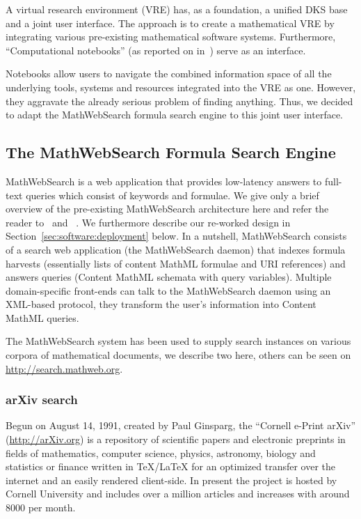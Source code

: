 \def\MWS{MathWebSearch\xspace}

A virtual research environment (VRE) has, as a foundation, a unified DKS base and a joint user interface. 
The \pn approach is to create a mathematical VRE by integrating various pre-existing mathematical software systems. 
Furthermore, ``Computational notebooks'' (as reported on in~\cite{ODK-D4.2}) serve as an interface. 

Notebooks allow users to navigate the combined information space of all the underlying tools, systems and resources integrated into the VRE as one. 
However, they aggravate the already serious problem of finding anything. 
Thus, we decided to adapt the \MWS formula search engine to this joint user interface. 

\subsection{The \MWS Formula Search Engine}

\MWS is a web application that provides low-latency answers to full-text queries which consist of keywords and formulae.
We give only a brief overview of the pre-existing \MWS architecture here and refer the reader to~\cite{ProKoh:mwssofse12} and ~\cite{ODK-D6.1}. 
We furthermore describe our re-worked design in Section~\ref{sec:software:deployment} below.
In a nutshell, \MWS consists of a search web application (the \MWS daemon) that indexes formula harvests (essentially lists of content MathML formulae and URI references) and answers queries (Content MathML schemata with query variables).
Multiple domain-specific front-ends can talk to the \MWS daemon using an XML-based protocol, they transform the user's information into Content MathML queries. 

The \MWS system has been used to supply search instances on various corpora of mathematical documents, we describe two here, others can be seen on \url{http://search.mathweb.org}. 

\subsubsection{arXiv search}

Begun on August 14, 1991, created by Paul Ginsparg, the ``Cornell e-Print arXiv'' (\url{http://arXiv.org}) is a repository of scientific papers and electronic preprints in
fields of mathematics, computer science, physics, astronomy, biology and statistics or finance written in {\TeX/\LaTeX} for an optimized transfer over the internet and an easily rendered client-side.
In present the project is hosted by Cornell University and includes over a million articles and increases with around 8000 per month.

